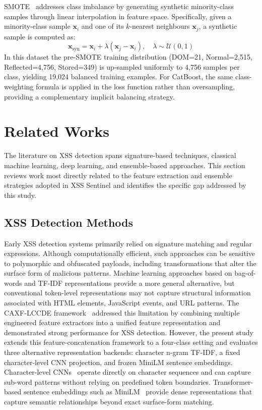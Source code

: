\documentclass[11pt,a4paper]{article}
\begin{document}
SMOTE~\cite{smote2002} addresses class imbalance by generating synthetic minority-class samples
through linear interpolation in feature space. Specifically, given a minority-class sample
$\mathbf{x}_i$ and one of its $k$-nearest neighbours $\mathbf{x}_j$, a synthetic sample is computed
as:
\begin{equation}
  \mathbf{x}_{\text{syn}} = \mathbf{x}_i + \lambda (\mathbf{x}_j - \mathbf{x}_i),
  \quad \lambda \sim \mathcal{U}(0,1)
  \label{eq:smote}
\end{equation}
In this dataset the pre-SMOTE training distribution (DOM=21, Normal=2,515, Reflected=4,756,
Stored=349) is up-sampled uniformly to 4,756 samples per class, yielding 19,024 balanced training
examples. For CatBoost, the same class-weighting formula is applied in the loss function rather than
oversampling, providing a complementary implicit balancing strategy.

\section{Related Works}
\label{sec:related}

The literature on XSS detection spans signature-based techniques, classical
machine learning, deep learning, and ensemble-based approaches. This section
reviews work most directly related to the feature extraction and ensemble
strategies adopted in XSS Sentinel and identifies the specific gap addressed
by this study.

\subsection{XSS Detection Methods}

Early XSS detection systems primarily relied on signature matching and
regular expressions. Although computationally efficient, such approaches can
be sensitive to polymorphic and obfuscated payloads, including transformations
that alter the surface form of malicious patterns. Machine learning approaches
based on bag-of-words and TF-IDF representations provide a more general
alternative, but conventional token-level representations may not capture
structural information associated with HTML elements, JavaScript events, and
URL patterns. The CAXF-LCCDE framework~\cite{hua2025caxf} addressed this
limitation by combining multiple engineered feature extractors into a unified
feature representation and demonstrated strong performance for XSS detection.
However, the present study extends this feature-concatenation framework to a
four-class setting and evaluates three alternative representation backends:
character n-gram TF-IDF, a fixed character-level CNN projection, and frozen
MiniLM sentence embeddings. Character-level CNNs~\cite{charcnn_zhang2015}
operate directly on character sequences and can capture sub-word patterns
without relying on predefined token boundaries. Transformer-based sentence
embeddings such as MiniLM~\cite{minilm2020} provide dense representations that
capture semantic relationships beyond exact surface-form matching.
\end{document}

